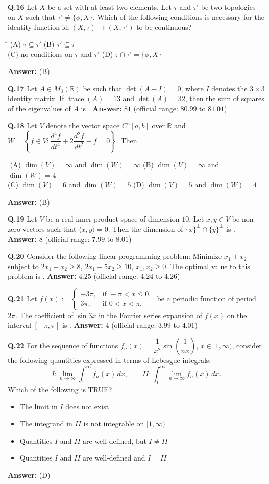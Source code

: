\documentclass[11pt,a4paper]{article}
\newcommand{\optsfourA}[4]{%
  \begin{tabbing}
    \hspace{0.48\linewidth}\=\kill
    (A) #1 \> (B) #2 \\[2pt]
    (C) #3 \> (D) #4
  \end{tabbing}%
}
\newcommand{\optslistA}[4]{%
  \begin{itemize}
    \setlength{\itemsep}{2pt}\setlength{\parskip}{0pt}
    \item[(A)] #1
    \item[(B)] #2
    \item[(C)] #3
    \item[(D)] #4
  \end{itemize}%
}
\newcommand{\ans}[1]{\textbf{Answer:} #1\par\medskip}
\begin{document}
\textbf{Q.16} Let $X$ be a set with at least two elements. Let $\tau$ and $\tau'$ be two topologies on $X$ such that $\tau' \ne \{\phi, X\}$. Which of the following conditions is necessary for the identity function $\mathrm{id} : (X, \tau) \to (X, \tau')$ to be continuous?
\optsfourA{$\tau \subseteq \tau'$}{$\tau' \subseteq \tau$}{no conditions on $\tau$ and $\tau'$}{$\tau \cap \tau' = \{\phi, X\}$}
\ans{(B)}

\textbf{Q.17} Let $A \in M_3(\mathbb{R})$ be such that $\det(A - I) = 0$, where $I$ denotes the $3 \times 3$ identity matrix. If $\operatorname{trace}(A) = 13$ and $\det(A) = 32$, then the sum of squares of the eigenvalues of $A$ is \underline{\hspace{2cm}}.
\ans{$81$ (official range: $80.99$ to $81.01$)}

\textbf{Q.18} Let $V$ denote the vector space $C^5[a, b]$ over $\mathbb{R}$ and $W = \left\{f \in V : \dfrac{d^4 f}{dt^4} + 2\dfrac{d^2 f}{dt^2} - f = 0\right\}$. Then
\optsfourA{$\dim(V) = \infty$ and $\dim(W) = \infty$}{$\dim(V) = \infty$ and $\dim(W) = 4$}{$\dim(V) = 6$ and $\dim(W) = 5$}{$\dim(V) = 5$ and $\dim(W) = 4$}
\ans{(B)}

\textbf{Q.19} Let $V$ be a real inner product space of dimension $10$. Let $x, y \in V$ be non-zero vectors such that $\langle x, y \rangle = 0$. Then the dimension of $\{x\}^\perp \cap \{y\}^\perp$ is \underline{\hspace{2cm}}.
\ans{$8$ (official range: $7.99$ to $8.01$)}

\textbf{Q.20} Consider the following linear programming problem: Minimize $x_1 + x_2$ subject to $2x_1 + x_2 \ge 8$, $2x_1 + 5x_2 \ge 10$, $x_1, x_2 \ge 0$. The optimal value to this problem is \underline{\hspace{2cm}}.
\ans{$4.25$ (official range: $4.24$ to $4.26$)}

\textbf{Q.21} Let $f(x) := \begin{cases} -3\pi, & \text{if } -\pi < x \le 0, \\ 3\pi, & \text{if } 0 < x < \pi, \end{cases}$ be a periodic function of period $2\pi$. The coefficient of $\sin 3x$ in the Fourier series expansion of $f(x)$ on the interval $[-\pi, \pi]$ is \underline{\hspace{2cm}}.
\ans{$4$ (official range: $3.99$ to $4.01$)}

\textbf{Q.22} For the sequence of functions $f_n(x) = \dfrac{1}{x^2}\sin\!\left(\dfrac{1}{nx}\right)$, $x \in [1, \infty)$, consider the following quantities expressed in terms of Lebesgue integrals:
\[
  I : \lim_{n\to\infty} \int_1^\infty f_n(x)\,dx, \qquad II : \int_1^\infty \lim_{n\to\infty} f_n(x)\,dx.
\]
Which of the following is TRUE?
\optslistA{The limit in $I$ does not exist}{The integrand in $II$ is not integrable on $[1, \infty)$}{Quantities $I$ and $II$ are well-defined, but $I \ne II$}{Quantities $I$ and $II$ are well-defined and $I = II$}
\ans{(D)}
\end{document}
